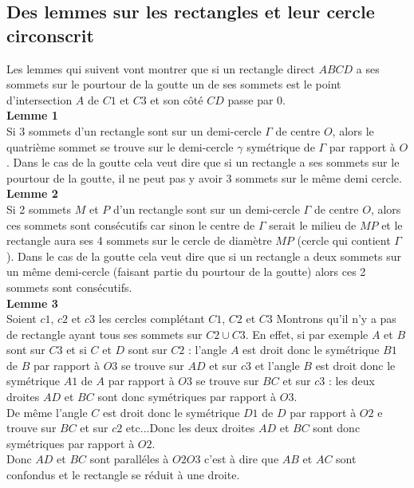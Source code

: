 \documentclass[a4paper,11pt]{book}
\begin{document}
\subsection{Des  lemmes sur les rectangles et leur cercle circonscrit}
Les lemmes qui suivent vont montrer que si un rectangle direct $ABCD$ a ses 
sommets sur le pourtour de la goutte un de ses sommets est le point 
d'intersection $A$ de $C1$ et $C3$ et son c\^ot\'e $CD$ passe par $0$.\\

{\bf Lemme 1}\\
Si 3 sommets d'un rectangle sont sur un demi-cercle $\Gamma$ de centre $O$, 
alors le quatri\`eme sommet se trouve sur le demi-cercle $\gamma$ sym\'etrique 
de $\Gamma$ par rapport \`a $O$. Dans le cas de la goutte cela veut 
dire que si un rectangle a ses sommets sur le pourtour de la goutte, il ne peut
pas y avoir 3 sommets sur le m\^eme demi cercle.\\ 

{\bf Lemme 2}\\
Si 2 sommets $M$ et $P$ d'un rectangle sont sur un demi-cercle $\Gamma$ de 
centre $O$, alors ces sommets sont cons\'ecutifs car sinon le centre de 
$\Gamma$ serait le milieu de $MP$ et le rectangle aura ses 4 sommets  sur le 
cercle de diam\`etre $MP$ (cercle qui contient $\Gamma$). Dans le cas de la 
goutte cela veut dire que si un rectangle a deux sommets sur un m\^eme 
demi-cercle (faisant partie du pourtour de la goutte) alors ces 2 sommets sont 
cons\'ecutifs.\\ 

{\bf Lemme 3}\\
Soient $c1$, $c2$ et $c3$ les cercles compl\'etant $C1$, $C2$ et $C3$
Montrons qu'il n'y a pas de rectangle ayant tous ses sommets sur $C2\cup C3$.
En effet, si par exemple $A$ et $B$ sont sur $C3$ et si $C$ et $D$ sont sur 
$C2$ : l'angle $A$ est droit donc le sym\'etrique $B1$ de $B$ par rapport \`a 
$O3$ se trouve sur $AD$ et sur $c3$ et l'angle $B$ est droit donc le 
sym\'etrique $A1$ de $A$ par rapport \`a $O3$ se trouve sur $BC$ et sur $c3$ : 
les deux droites $AD$ et $BC$ sont donc sym\'etriques par rapport \`a $O3$.\\
De m\^eme l'angle $C$ est droit donc le sym\'etrique $D1$ de $D$ par rapport 
\`a $O2$ e trouve sur $BC$ et sur $c2$ etc...Donc les deux droites $AD$ et $BC$
sont donc sym\'etriques par rapport \`a $O2$.\\
Donc $AD$ et $BC$ sont parall\'eles \`a $O2O3$ c'est \`a dire que $AB$ et $AC$ sont confondus et le rectangle se r\'eduit \`a une droite.\\
\end{document}
